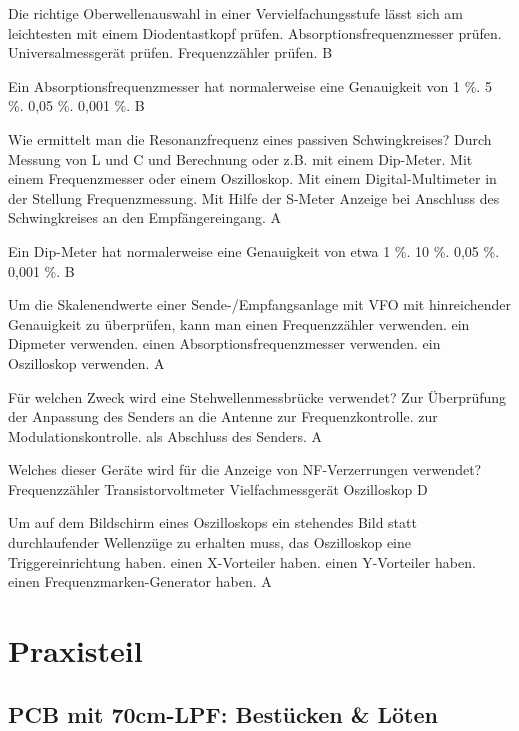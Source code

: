 {Die richtige Oberwellenauswahl in einer Vervielfachungsstufe lässt sich am leichtesten mit einem}%
{Diodentastkopf prüfen.}%
{Absorptionsfrequenzmesser prüfen.}%
{Universalmessgerät prüfen.}%
{Frequenzzähler prüfen.}%
{B}%


{Ein Absorptionsfrequenzmesser hat normalerweise eine Genauigkeit von}%
{1 \%.}%
{5 \%. }%
{0,05 \%.}%
{0,001 \%.}%
{B}%


{Wie ermittelt man die Resonanzfrequenz eines passiven Schwingkreises?}%
{Durch Messung von L und C und Berechnung oder z.B. mit einem Dip-Meter.}%
{Mit einem Frequenzmesser oder einem Oszilloskop.}%
{Mit einem Digital-Multimeter in der Stellung Frequenzmessung.}%
{Mit Hilfe der S-Meter Anzeige bei Anschluss des Schwingkreises an den Empfängereingang.}%
{A}%

{Ein Dip-Meter hat normalerweise eine Genauigkeit von etwa}%
{1 \%.}%
{10 \%.}%
{0,05 \%.}%
{0,001 \%.}%
{B}%

{Um die Skalenendwerte einer Sende-/Empfangsanlage mit VFO mit hinreichender Genauigkeit zu überprüfen, kann man}%
{einen Frequenzzähler verwenden.}%
{ein Dipmeter verwenden.}%
{einen Absorptionsfrequenzmesser verwenden.}%
{ein Oszilloskop verwenden.}%
{A}%

{Für welchen Zweck wird eine Stehwellenmessbrücke verwendet?}%
{Zur Überprüfung der Anpassung des Senders an die Antenne}%
{zur Frequenzkontrolle.}%
{zur Modulationskontrolle.}%
{als Abschluss des Senders.}%
{A}%

{Welches dieser Geräte wird für die Anzeige von NF-Verzerrungen verwendet?}%
{Frequenzzähler}%
{Transistorvoltmeter}%
{Vielfachmessgerät}%
{Oszilloskop}%
{D}%

{Um auf dem Bildschirm eines Oszilloskops ein stehendes Bild statt durchlaufender Wellenzüge zu erhalten muss, das Oszilloskop}%
{eine Triggereinrichtung haben.}%
{einen X-Vorteiler haben.}%
{einen Y-Vorteiler haben. \vspace*{-0.06cm}}%
{einen Frequenzmarken-Generator haben.}%
{A}%


\section*{Praxisteil}

\subsection*{PCB mit 70cm-LPF: Bestücken \& Löten}

